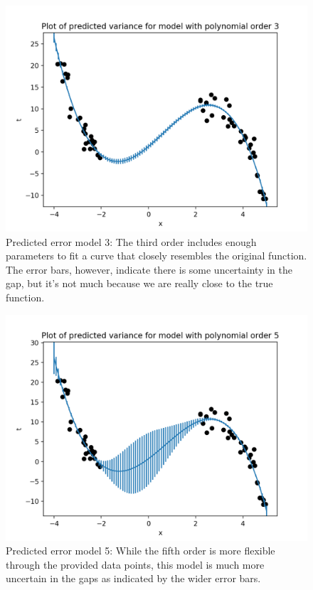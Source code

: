\documentclass[10pt]{article}
\begin{document}
\begin{itemize}
\begin{figure}[H]
\centering
  \includegraphics[width=\linewidth]{error-3.png}
 \caption{Predicted error model 3: The third order includes enough parameters to fit a curve that closely resembles the original function. The error bars, however, indicate there is some uncertainty in the gap, but it's not much because we are really close to the true function.}
\label{label}
\end{figure}

\begin{figure}[H]
\centering
  \includegraphics[width=\linewidth]{error-5.png}
 \caption{Predicted error model 5: While the fifth order is more flexible through the provided data points, this model is much more uncertain in the gaps as indicated by the wider error bars.}
\label{label}
\end{figure}


\end{itemize}
\end{document}
